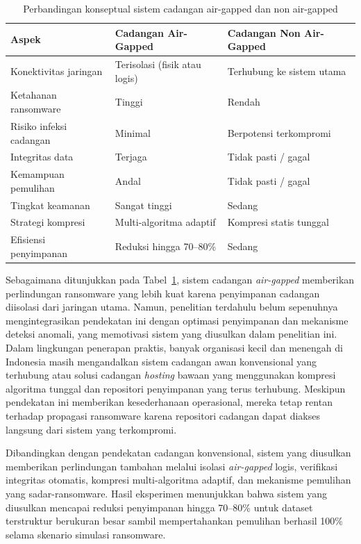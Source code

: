 \documentclass{iaesarticle}
\begin{document}
\begin{table}[H]
\centering
\fontsize{8pt}{10pt}\selectfont
\caption{Perbandingan konseptual sistem cadangan air-gapped dan non air-gapped}
\label{tab:airgap_comparison}
\begin{tabularx}{\textwidth}{@{}p{3.2cm} X X@{}}
\hline
\textbf{Aspek} & \textbf{Cadangan Air-Gapped} & \textbf{Cadangan Non Air-Gapped} \\
\hline
Konektivitas jaringan & Terisolasi (fisik atau logis) & Terhubung ke sistem utama \\
Ketahanan ransomware & Tinggi & Rendah \\
Risiko infeksi cadangan & Minimal & Berpotensi terkompromi \\
Integritas data & Terjaga & Tidak pasti / gagal \\
Kemampuan pemulihan & Andal & Tidak pasti / gagal \\
Tingkat keamanan & Sangat tinggi & Sedang \\
Strategi kompresi & Multi-algoritma adaptif & Kompresi statis tunggal \\
Efisiensi penyimpanan & Reduksi hingga 70--80\% & Sedang \\
\hline
\end{tabularx}
\end{table}

Sebagaimana ditunjukkan pada Tabel~\ref{tab:airgap_comparison}, sistem cadangan \textit{air-gapped} memberikan perlindungan ransomware yang lebih kuat karena penyimpanan cadangan diisolasi dari jaringan utama. Namun, penelitian terdahulu belum sepenuhnya mengintegrasikan pendekatan ini dengan optimasi penyimpanan dan mekanisme deteksi anomali, yang memotivasi sistem yang diusulkan dalam penelitian ini. Dalam lingkungan penerapan praktis, banyak organisasi kecil dan menengah di Indonesia masih mengandalkan sistem cadangan awan konvensional yang terhubung atau solusi cadangan \textit{hosting} bawaan yang menggunakan kompresi algoritma tunggal dan repositori penyimpanan yang terus terhubung. Meskipun pendekatan ini memberikan kesederhanaan operasional, mereka tetap rentan terhadap propagasi ransomware karena repositori cadangan dapat diakses langsung dari sistem yang terkompromi.

Dibandingkan dengan pendekatan cadangan konvensional, sistem yang diusulkan memberikan perlindungan tambahan melalui isolasi \textit{air-gapped} logis, verifikasi integritas otomatis, kompresi multi-algoritma adaptif, dan mekanisme pemulihan yang sadar-ransomware. Hasil eksperimen menunjukkan bahwa sistem yang diusulkan mencapai reduksi penyimpanan hingga 70--80\% untuk dataset terstruktur berukuran besar sambil mempertahankan pemulihan berhasil 100\% selama skenario simulasi ransomware.
\end{document}
